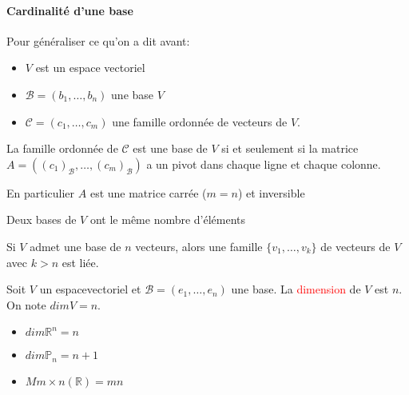 \paragraph{Cardinalité d'une base}
Pour généraliser ce qu'on a dit avant:
\begin{itemize}
    \item $V$ est un espace vectoriel
    \item $\mathcal{B} = (b_1, \dots, b_n)$ une base $V$
    \item $\mathcal{C} = (c_1, \dots, c_m)$ une famille ordonnée de vecteurs de $V$.
\end{itemize}

\begin{theoreme}
    La famille ordonnée de $\mathcal{C}$ est une base de $V$ si et seulement si la matrice $A = ((c_1)_{\mathcal{B}}, \dots, (c_m)_{\mathcal{B}})$ a un pivot dans chaque ligne et chaque colonne.
\end{theoreme}
\begin{framedremark}
    En particulier $A$ est une matrice carrée ($m = n$) et inversible
\end{framedremark}
\begin{theoreme}
    Deux bases de $V$ ont le même nombre d'éléments
\end{theoreme}
\begin{corollaire}
Si $V$ admet une base de $n$ vecteurs, alors une famille $\{v_1, \dots, v_k\}$ de vecteurs de $V$ avec $k > n$ est liée.
\end{corollaire}
\begin{definition}
    Soit $V$ un espacevectoriel et $\mathcal{B} = (e_1, \dots, e_n)$ une base. La \textcolor{red}{dimension} de $V$ est $n$. On note $dim V = n$.
\end{definition}

\begin{itemize}
    \item $dim \mathbb{R}^n = n$
    \item $dim \mathbb{P}_n = n+1$
    \item $M{m\times n}(\mathbb{R}) = mn$
\end{itemize}